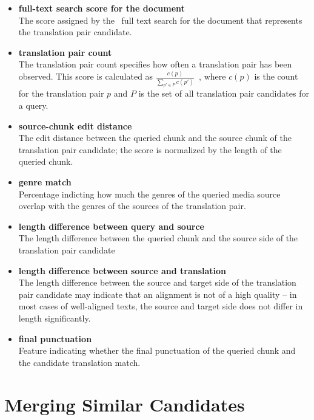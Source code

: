 \begin{itemize}
	
	\item \textbf{full-text search score for the document}\\
	The score assigned by the \postgres~full text search for the document that represents the translation pair candidate.
    
	\item \textbf{translation pair count}\\
	The translation pair count specifies how often a translation pair has been observed. This score is calculated as $\frac{c(p)}{ \sum_{p' \in P}{c(p')}  } $\ , where $c(p)$ is the count for the translation pair $p$ and $P$ is the set of all translation pair candidates for a query.
	
	\item \textbf{source-chunk edit distance}\\
	The edit distance between the queried chunk and the source chunk of the translation pair candidate; the score is normalized by the length of the queried chunk.
	
	\item \textbf{genre match}\\
	Percentage indicting how much the genres of the queried media source overlap with the genres of the sources of the translation pair.

	\item \textbf{length difference between query and source}\\
	The length difference between the queried chunk and the source side of the translation pair candidate 

	\item \textbf{length difference between source and translation}\\
	The length difference between the source and target side of the translation pair candidate may indicate that an alignment is not of a high quality -- in most cases of well-aligned texts, the source and target side does not differ in length significantly.
	
	\item \textbf{final punctuation}\\
	Feature indicating whether the final punctuation of the queried chunk and the candidate translation match.

\end{itemize}



\section{Merging Similar Candidates}

